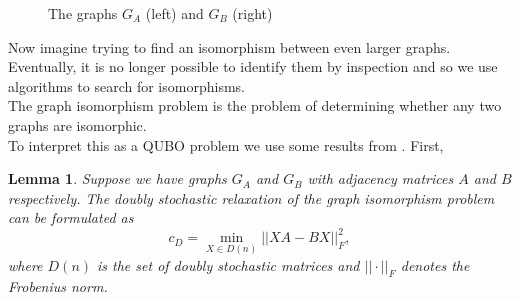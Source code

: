 \documentclass{article}
\newtheorem{lem}[prop]{Lemma}
\begin{document}
\begin{figure}[H]
\begin{subfigure}[h]{0.4\linewidth}
    \end{subfigure}
    \caption{The graphs \(G_A\) (left) and \(G_B\) (right)}
    \label{fig:1}
\end{figure}

\noindent Now imagine trying to find an isomorphism between even larger graphs. Eventually, it is no longer possible to identify them by inspection and so we use algorithms to search for isomorphisms. \\

\noindent The graph isomorphism problem is the problem of determining whether any two graphs are isomorphic.\\

\noindent To interpret this as a QUBO problem we use some results from \autocite{klus2023continuous}. First,\\

\begin{lem}\label{lem:StochasticIso}
\cite[p.~6]{klus2023continuous} Suppose we have graphs \(G_A\) and \(G_B\) with adjacency matrices \(A\) and \(B\) respectively. The doubly stochastic relaxation of the graph isomorphism problem can be formulated as
\begin{equation*}
    c_D = \min_{X \in D(n)} ||XA - BX||^2_F,
\end{equation*}
where \(D(n)\) is the set of doubly stochastic matrices and \(||\cdot||_F\) denotes the Frobenius norm.
\end{lem}
\end{document}
